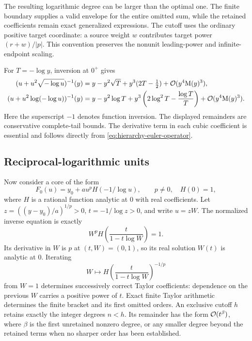 The resulting logarithmic degree can be larger than the optimal one. The
finite boundary supplies a valid envelope for the entire omitted sum,
while the retained coefficients remain exact generalized expressions.
The cutoff uses the ordinary positive target coordinate: a source weight
$w$ contributes target power $(r+w)/|p|$. This convention preserves the
nonunit leading-power and infinite-endpoint scaling.

\begin{example}
For $T=-\log y$, inversion at $0^+$ gives
\begin{align}
 (u+u^2\sqrt{-\log u})^{-1}(y)
 &=y-y^2\sqrt T+y^3(2T-\tfrac12)+\mathcal O(y^4\mathrm M(y)^3),
 \label{eq:inverse-sqrt-log-coefficient}\\
 (u+u^2\log(-\log u))^{-1}(y)
 &=y-y^2\log T
 +y^3\left(2\log^2T-\frac{\log T}{T}\right)
 +\mathcal O(y^4\mathrm M(y)^3).
 \label{eq:inverse-iterated-log-coefficient}
\end{align}
Here the superscript $-1$ denotes function inversion. The displayed
remainders are conservative complete-tail bounds.
The derivative term in each cubic coefficient is essential and follows
directly from \eqref{eq:hierarchy-euler-operator}.
\end{example}

\subsection{Reciprocal-logarithmic units}

Now consider a core of the form
\begin{equation}
 F_0(u)=y_0+a u^p H(-1/\log u),
 \qquad p\ne0,\quad H(0)=1,
 \label{eq:reciprocal-log-core}
\end{equation}
where $H$ is a rational function analytic at $0$ with real coefficients.
Let $z=((y-y_0)/a)^{1/p}>0$, $t=-1/\log z>0$, and write $u=zW$.
The normalized inverse equation is exactly
\begin{equation}
 W^p H\left(\frac{t}{1-t\log W}\right)=1.
 \label{eq:reciprocal-log-unit-equation}
\end{equation}
Its derivative in $W$ is $p$ at $(t,W)=(0,1)$, so its real solution
$W(t)$ is analytic at $0$. Iterating
\begin{equation}
 W\longmapsto
 H\left(\frac{t}{1-t\log W}\right)^{-1/p}
 \label{eq:reciprocal-log-fixed-point}
\end{equation}
from $W=1$ determines successively correct Taylor coefficients: dependence
on the previous $W$ carries a positive power of $t$. Exact finite Taylor
arithmetic determines the finite bracket and its first omitted orders.
An exclusive cutoff $h$ retains exactly the integer degrees $n<h$.
Its remainder has the form $\mathcal O(t^\beta)$, where $\beta$ is the first
unretained nonzero degree, or any smaller degree beyond the retained terms
when no sharper order has been established.

